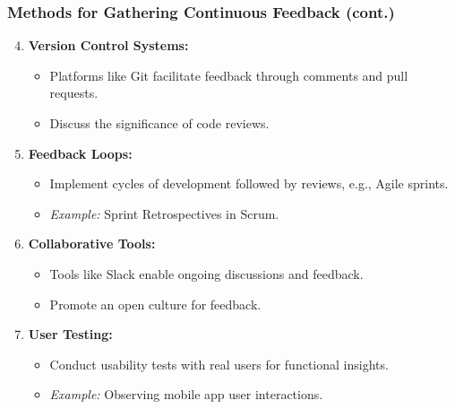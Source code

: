 \documentclass[aspectratio=169]{beamer}
\begin{document}
\begin{frame}[fragile]
    \frametitle{Methods for Gathering Continuous Feedback (cont.)}
    \begin{enumerate}
        \setcounter{enumi}{3} %
        \item \textbf{Version Control Systems:}
            \begin{itemize}
                \item Platforms like Git facilitate feedback through comments and pull requests.
                \item Discuss the significance of code reviews.
            \end{itemize}
        
        \item \textbf{Feedback Loops:}
            \begin{itemize}
                \item Implement cycles of development followed by reviews, e.g., Agile sprints.
                \item \textit{Example:} Sprint Retrospectives in Scrum.
            \end{itemize}

        \item \textbf{Collaborative Tools:}
            \begin{itemize}
                \item Tools like Slack enable ongoing discussions and feedback.
                \item Promote an open culture for feedback.
            \end{itemize}

        \item \textbf{User Testing:}
            \begin{itemize}
                \item Conduct usability tests with real users for functional insights.
                \item \textit{Example:} Observing mobile app user interactions.
            \end{itemize}
    \end{enumerate}
\end{frame}
\end{document}
